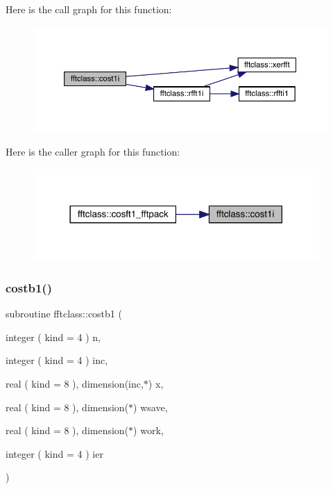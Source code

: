 Here is the call graph for this function\+:\nopagebreak
\begin{figure}[H]
\begin{center}
\leavevmode
\includegraphics[width=350pt]{namespacefftclass_aa0605a45256c5ff2bfcd9229dd8854e4_cgraph}
\end{center}
\end{figure}
Here is the caller graph for this function\+:\nopagebreak
\begin{figure}[H]
\begin{center}
\leavevmode
\includegraphics[width=309pt]{namespacefftclass_aa0605a45256c5ff2bfcd9229dd8854e4_icgraph}
\end{center}
\end{figure}
\mbox{\label{namespacefftclass_a2769de58926e8dc80c0fa9f862de7dce}} 
\subsubsection{\texorpdfstring{costb1()}{costb1()}}
{\footnotesize\ttfamily subroutine fftclass\+::costb1 (\begin{DoxyParamCaption}\item[{integer ( kind = 4 )}]{n,  }\item[{integer ( kind = 4 )}]{inc,  }\item[{real ( kind = 8 ), dimension(inc,$\ast$)}]{x,  }\item[{real ( kind = 8 ), dimension($\ast$)}]{wsave,  }\item[{real ( kind = 8 ), dimension($\ast$)}]{work,  }\item[{integer ( kind = 4 )}]{ier }\end{DoxyParamCaption})}

